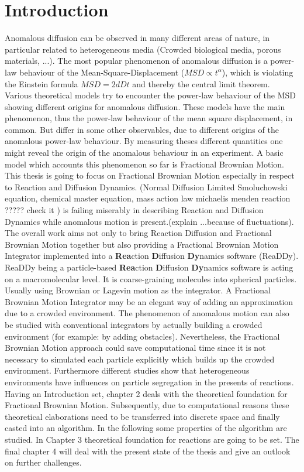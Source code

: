 \documentclass[
  a4paper,BCOR10mm,oneside,
  bibtotoc,idxtotoc,
  headsepline,footsepline,%
  fleqn,openbib
]{scrbook}
\begin{document}
\chapter{Introduction}
Anomalous diffusion can be observed in many different areas of nature, in particular related to heterogeneous media (Crowded biological media, porous materials, ...). The most popular phenomenon of anomalous diffusion is a power-law behaviour of the Mean-Square-Displacement ($MSD\propto t^{\alpha}$), which is violating the Einstein formula $MSD=2 d D t$ and thereby the central limit theorem. Various theoretical models try to encounter the power-law behaviour of the MSD showing different origins for anomalous diffusion. These models have the main phenomenon, thus the power-law behaviour of the mean square displacement, in common. But differ in some other observables, due to different origins of the anomalous power-law behaviour. By measuring theses different quantities one might reveal the origin of the anomalous behaviour in an experiment.\newline
A basic model which accounts this phenomenon so far is Fractional Brownian Motion. This thesis is going to focus on Fractional Brownian Motion especially in respect to Reaction and Diffusion Dynamics. (Normal Diffusion Limited Smoluchowski equation, chemical master equation, mass action law michaelis menden reaction ????? check it ) is failing miserably in describing Reaction and Diffusion Dynamics while anomalous motion is present.(explain ...because of fluctuations). The overall work aims not only to bring Reaction Diffusion and Fractional Brownian Motion together but also providing a Fractional Brownian Motion Integrator implemented into a \textbf{Rea}ction \textbf{D}iffusion \textbf{Dy}namics software (ReaDDy). ReaDDy being a particle-based \textbf{Rea}ction \textbf{D}iffusion \textbf{Dy}namics software is acting on a macromolecular level. It is coarse-graining molecules into spherical particles. Usually using Brownian or Lagevin motion as the integrator. A Fractional Brownian Motion Integrator may be an elegant way of adding an approximation due to a crowded environment. The phenomenon of anomalous motion can also be studied with conventional integrators by actually building a crowded environment (for example: by adding obstacles). Nevertheless, the Fractional Brownian Motion approach could save computational time since it is not necessary to simulated each particle  explicitly which builds up the crowded environment. Furthermore different studies show that heterogeneous environments have influences on particle segregation in the presents of reactions.\newline
Having an Introduction set, chapter 2 deals with the theoretical foundation for Fractional Brownian Motion. Subsequently, due to computational reasons these theoretical elaborations need to be transferred into discrete space and finally casted into an algorithm. In the following some properties of the algorithm are studied.
In Chapter 3 theoretical foundation for reactions are going to be set. The final chapter 4 will deal with the present state of the thesis and give an outlook on further challenges.  
\end{document}
